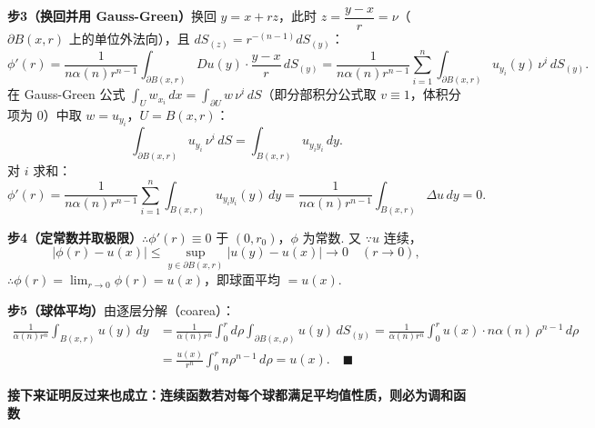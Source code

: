 \documentclass{article}
\begin{document}
\noindent\textbf{步3（换回并用 Gauss-Green）}\quad 换回 $y = x+rz$，此时 $z = \dfrac{y-x}{r} = \nu$（$\partial B(x,r)$ 上的单位外法向），且 $dS_{(z)} = r^{-(n-1)} dS_{(y)}$：
\[
\phi'(r) = \frac{1}{n\alpha(n) r^{n-1}} \int_{\partial B(x,r)} Du(y) \cdot \frac{y-x}{r}\, dS_{(y)} = \frac{1}{n\alpha(n) r^{n-1}} \sum_{i=1}^n \int_{\partial B(x,r)} u_{y_i}(y)\, \nu^i\, dS_{(y)}.
\]
在 Gauss-Green 公式 $\displaystyle \int_U w_{x_i}\, dx = \int_{\partial U} w\, \nu^i\, dS$（即分部积分公式取 $v \equiv 1$，体积分项为 $0$）中取 $w = u_{y_i}$，$U = B(x,r)$：
\[
\int_{\partial B(x,r)} u_{y_i}\, \nu^i\, dS = \int_{B(x,r)} u_{y_i y_i}\, dy.
\]
对 $i$ 求和：
\[
\phi'(r) = \frac{1}{n\alpha(n) r^{n-1}} \sum_{i=1}^n \int_{B(x,r)} u_{y_i y_i}(y)\, dy = \frac{1}{n\alpha(n) r^{n-1}} \int_{B(x,r)} \Delta u\, dy = 0.
\]

\noindent\textbf{步4（定常数并取极限）}\quad $\therefore \phi'(r) \equiv 0$ 于 $(0,r_0)$，$\phi$ 为常数. 又 $\because u$ 连续，
\[
|\phi(r) - u(x)| \leq \sup_{y \in \partial B(x,r)} |u(y) - u(x)| \to 0 \quad (r \to 0),
\]
$\therefore \phi(r) = \lim_{r \to 0} \phi(r) = u(x)$，即球面平均 $= u(x)$.

\noindent\textbf{步5（球体平均）}\quad 由逐层分解（coarea）：
\[
\begin{aligned}
	\frac{1}{\alpha(n) r^n} \int_{B(x,r)} u(y)\, dy &= \frac{1}{\alpha(n) r^n} \int_0^r d\rho \int_{\partial B(x,\rho)} u(y)\, dS_{(y)} = \frac{1}{\alpha(n) r^n} \int_0^r u(x) \cdot n\alpha(n)\, \rho^{n-1}\, d\rho \\
	&= \frac{u(x)}{r^n} \int_0^r n \rho^{n-1}\, d\rho = u(x). \quad \blacksquare
\end{aligned}
\]

\noindent\textbf{接下来证明反过来也成立：连续函数若对每个球都满足平均值性质，则必为调和函数}
\end{document}
